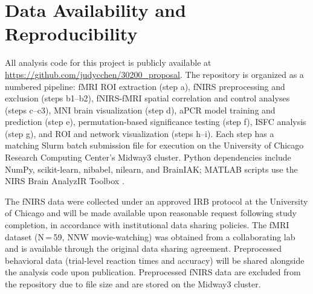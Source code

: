 
\section{Data Availability and Reproducibility}

All analysis code for this project is publicly available at \url{https://github.com/judycchen/30200_proposal}. The repository is organized as a numbered pipeline: fMRI ROI extraction (step a), fNIRS preprocessing and exclusion (steps b1--b2), fNIRS-fMRI spatial correlation and control analyses (steps c--c3), MNI brain visualization (step d), aPCR model training and prediction (step e), permutation-based significance testing (step f), ISFC analysis (step g), and ROI and network visualization (steps h--i). Each step has a matching Slurm batch submission file for execution on the University of Chicago Research Computing Center's Midway3 cluster. Python dependencies include NumPy, scikit-learn, nibabel, nilearn, and BrainIAK; MATLAB scripts use the NIRS Brain AnalyzIR Toolbox \citep{santosa2018}.

The fNIRS data were collected under an approved IRB protocol at the University of Chicago and will be made available upon reasonable request following study completion, in accordance with institutional data sharing policies. The fMRI dataset (N\,=\,59, NNW movie-watching) was obtained from a collaborating lab and is available through the original data sharing agreement. Preprocessed behavioral data (trial-level reaction times and accuracy) will be shared alongside the analysis code upon publication. Preprocessed fNIRS data are excluded from the repository due to file size and are stored on the Midway3 cluster.

